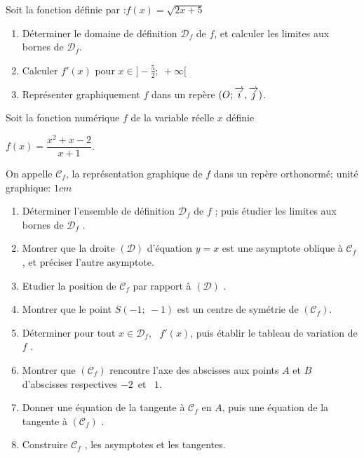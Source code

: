 \begin{exercice}
Soit la fonction d\'efinie par :$f(x)=\sqrt{2x+5}$
\begin{enumerate}
 \item D\'eterminer le domaine de d\'efinition $\mathscr{D}_f$ de $f$, et calculer les limites aux bornes de 
 $\mathscr{D}_f$. 
 \item Calculer $f'(x)$ pour $x\in \big]-\frac{5}{2};~+\infty\big[$
 \item Repr\'esenter graphiquement $f$ dans un rep\`ere $(O ;\overrightarrow{i},\overrightarrow{j})$.
\end{enumerate}
\end{exercice}
\begin{exercice} 
Soit la fonction num\'erique $ f $ de la variable r\'eelle $x$ d\'efinie 

$f(x)=\dfrac{x^2+x-2}{x+1}$.\medskip

On appelle $\mathscr{C}_f$, la repr\'esentation graphique de $f$ dans un rep\`ere orthonorm\'e; unit\'e graphique: $1cm$
\begin{enumerate}
 \item D\'eterminer l'ensemble de d\'efinition $\mathscr{D}_f$ de $f$ ; puis \'etudier les limites aux bornes de 
 $\mathscr{D}_f$ .
 \item Montrer que la droite  $(\mathcal{D})$ d'\'equation $y=x$ est une asymptote oblique \`a $\mathscr{C}_f$, et 
 pr\'eciser l'autre asymptote.
 \item Etudier la position de $\mathscr{C}_f$ par rapport  \`a $(\mathcal{D})$ .
 \item Montrer que le point $S(-1;~-1)$ est un centre de sym\'etrie de $(\mathscr{C}_f)$.
 \item D\'eterminer pour tout $x\in \mathscr{D}_f$, ~$f'(x)$, puis \'etablir le tableau de variation de $f$ .
 \item Montrer que $(\mathscr{C}_f)$ rencontre l'axe des abscisses aux points $A$ et $B$ d'abscisses respectives\;
 $-2$~et~ $1$.
 \item Donner une \'equation de la tangente \`a $\mathscr{C}_f$ en $A$, puis une \'equation de la tangente \`a 
 $(\mathscr{C}_f)$ .
 \item Construire $\mathscr{C}_f$ , les asymptotes et les tangentes.
\end{enumerate}
\end{exercice}
